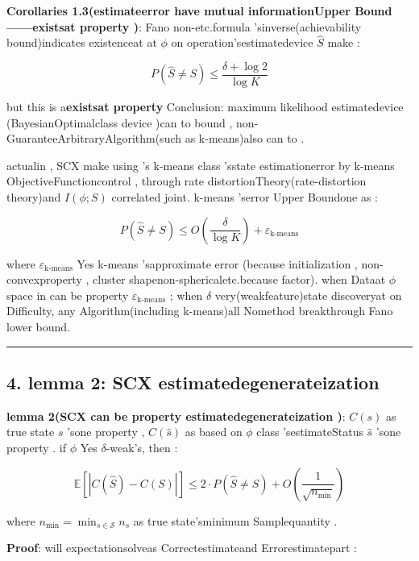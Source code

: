 \documentclass[
  12pt,
]{article}
\begin{document}
\textbf{Corollaries 1.3(estimateerror have mutual informationUpper Bound------existsat property )}: Fano
non-etc.formula 'sinverse(achievability bound)indicates existenceat at  \(\phi\) on operation'sestimatedevice 
\(\hat{S}\) make : 

\[P(\hat{S} \neq S) \leq \frac{\delta + \log 2}{\log K}\]

but this is a\textbf{existsat property }Conclusion: maximum likelihood estimatedevice (BayesianOptimalclass device )can to bound , non-GuaranteeArbitraryAlgorithm(such as 
k-means)also can to . 

actualin , SCX make using 's k-means class 'sstate estimationerror by  k-means
ObjectiveFunctioncontrol , through rate distortionTheory(rate-distortion theory)and 
\(I(\phi; S)\) correlated joint. k-means 'serror Upper Boundone as : 

\[P(\hat{S} \neq S) \leq O\left(\frac{\delta}{\log K}\right) + \varepsilon_{\text{k-means}}\]

where \(\varepsilon_{\text{k-means}}\) Yes k-means
'sapproximate error (because initialization , non-convexproperty , cluster shapenon-sphericaletc.because factor). when Dataat  \(\phi\)
space in can be property  \(\varepsilon_{\text{k-means}}\) ; when  \(\delta\)
very(weakfeature)state discoveryat on Difficulty, any Algorithm(including  k-means)all Nomethod breakthrough
Fano lower bound. 

\begin{center}\rule{0.5\linewidth}{0.5pt}\end{center}

\subsection{4. lemma  2: SCX
estimatedegenerateization }\label{ux5f15ux7406-2scx-ux4f30ux8ba1ux9000ux5316}

\textbf{lemma  2(SCX can be property estimatedegenerateization )}:  \(C(s)\) as true state \(s\)
'sone property , \(C(\hat{s})\) as based on  \(\phi\) class 'sestimateStatus \(\hat{s}\)
'sone property . if  \(\phi\) Yes \(\delta\)-weak's, then : 

\[\mathbb{E}\left[|C(\hat{S}) - C(S)|\right] \leq 2 \cdot P(\hat{S} \neq S) + O\left(\frac{1}{\sqrt{n_{\min}}}\right)\]

where \(n_{\min} = \min_{s \in \mathcal{S}} n_s\)
as true state'sminimum Samplequantity . 

\textbf{Proof}: will expectationsolveas Correctestimateand Errorestimatepart : 
\end{document}
